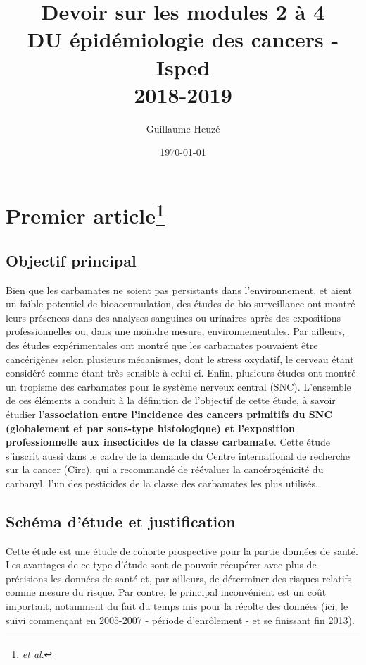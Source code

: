 \documentclass[10pt,english,french]{article}
\begin{document}
\title{Devoir sur les modules 2 à 4\\
\small{DU épidémiologie des cancers - Isped\\
2018-2019}}
\author{Guillaume Heuzé}
\date{\today}
\maketitle

\section{Premier article\protect\footnote{ \emph{et al}. }}

\subsection{Objectif principal}
Bien que les carbamates ne soient pas persistants dans l'environnement, et aient un faible potentiel de bioaccumulation, des études de bio surveillance ont montré leurs présences dans des analyses sanguines ou urinaires après des expositions professionnelles ou, dans une moindre mesure, environnementales. Par ailleurs, des études expérimentales ont montré que les carbamates pouvaient être cancérigènes selon plusieurs mécanismes, dont le stress oxydatif, le cerveau étant considéré comme étant très sensible à celui-ci. Enfin, plusieurs études ont montré un tropisme des carbamates pour le système nerveux central (SNC). L'ensemble de ces éléments a conduit à la définition de l'objectif de cette étude, à savoir étudier l'\textbf{association entre l'incidence des cancers primitifs du SNC (globalement et par sous-type histologique) et l'exposition professionnelle aux insecticides de la classe carbamate}. Cette étude s'inscrit aussi dans le cadre de la demande du Centre international de recherche sur la cancer (Circ), qui a recommandé de réévaluer la cancérogénicité du carbanyl, l'un des pesticides de la classe des carbamates les plus utilisés.

\subsection{Schéma d'étude et justification}
Cette étude est une étude de cohorte prospective pour la partie données de santé. Les avantages de ce type d'étude sont de pouvoir récupérer avec plus de précisions les données de santé et, par ailleurs, de déterminer des risques relatifs comme mesure du risque. Par contre, le principal inconvénient est un coût important, notamment du fait du temps mis pour la récolte des données (ici, le suivi commençant en 2005-2007 - période d'enrôlement - et se finissant fin 2013). 
\end{document}
